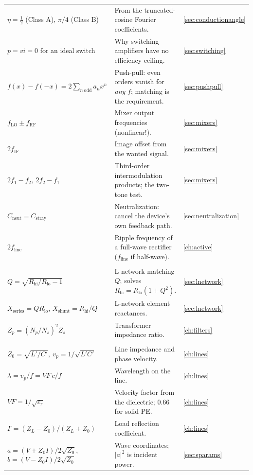 \begin{longtable}{@{}L{0.31\textwidth}L{0.47\textwidth}L{0.14\textwidth}@{}}
\(\eta=\tfrac12\) (Class A), \(\pi/4\) (Class B) & From the truncated-cosine Fourier coefficients. & \cref{sec:conductionangle} \\
\(p=vi=0\) for an ideal switch & Why switching amplifiers have no efficiency ceiling. & \cref{sec:switching} \\
\(f(x)-f(-x)=2\sum_{n\ \mathrm{odd}}a_nx^n\) & Push-pull: even orders vanish for \emph{any} \(f\); matching is the requirement. & \cref{sec:pushpull} \\
\(f_{\mathrm{LO}}\pm f_{\mathrm{RF}}\) & Mixer output frequencies (nonlinear!). & \cref{sec:mixers} \\
\(2f_{\mathrm{IF}}\) & Image offset from the wanted signal. & \cref{sec:mixers} \\
\(2f_1-f_2,\ 2f_2-f_1\) & Third-order intermodulation products; the two-tone test. & \cref{sec:mixers} \\
\(C_{\text{neut}}=C_{\text{stray}}\) & Neutralization: cancel the device's own feedback path. & \cref{sec:neutralization} \\
\(2f_{\text{line}}\) & Ripple frequency of a full-wave rectifier (\(f_{\text{line}}\) if half-wave). & \cref{ch:active} \\
\addlinespace
{}\\
\(Q=\sqrt{R_{\text{hi}}/R_{\text{lo}}-1}\) & L-network matching \(Q\); solves \(R_{\text{hi}}=R_{\text{lo}}(1+Q^2)\). & \cref{sec:lnetwork} \\
\(X_{\text{series}}=QR_{\text{lo}}\), \(X_{\text{shunt}}=R_{\text{hi}}/Q\) & L-network element reactances. & \cref{sec:lnetwork} \\
\(Z_p=(N_p/N_s)^2Z_s\) & Transformer impedance ratio. & \cref{ch:filters} \\
\addlinespace
{}\\
\(Z_0=\sqrt{L'/C'},\ v_p=1/\sqrt{L'C'}\) & Line impedance and phase velocity. & \cref{ch:lines} \\
\(\lambda=v_p/f=VF\,c/f\) & Wavelength on the line. & \cref{ch:lines} \\
\(VF=1/\sqrt{\varepsilon_r}\) & Velocity factor from the dielectric; \(0.66\) for solid PE. & \cref{ch:lines} \\
\(\Gamma=(Z_L-Z_0)/(Z_L+Z_0)\) & Load reflection coefficient. & \cref{ch:lines} \\
\(a=(V+Z_0I)/2\sqrt{Z_0}\), \(b=(V-Z_0I)/2\sqrt{Z_0}\) & Wave coordinates; \(|a|^2\) is incident power. & \cref{sec:sparams} \\

\end{longtable}
